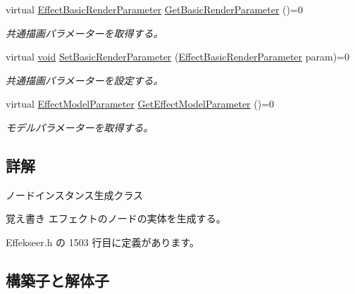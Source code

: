 \begin{DoxyCompactItemize}
virtual \mbox{\hyperlink{struct_effekseer_1_1_effect_basic_render_parameter}{Effect\+Basic\+Render\+Parameter}} \mbox{\hyperlink{class_effekseer_1_1_effect_node_a5066e8209dabdcab46eb5fb64de5180d}{Get\+Basic\+Render\+Parameter}} ()=0
\begin{DoxyCompactList}\small\item\em 共通描画パラメーターを取得する。 \end{DoxyCompactList}\item 
virtual \mbox{\hyperlink{namespace_effekseer_ab34c4088e512200cf4c2716f168deb56}{void}} \mbox{\hyperlink{class_effekseer_1_1_effect_node_a064ec945f4ced3b7935520d625e4c92e}{Set\+Basic\+Render\+Parameter}} (\mbox{\hyperlink{struct_effekseer_1_1_effect_basic_render_parameter}{Effect\+Basic\+Render\+Parameter}} param)=0
\begin{DoxyCompactList}\small\item\em 共通描画パラメーターを設定する。 \end{DoxyCompactList}\item 
virtual \mbox{\hyperlink{struct_effekseer_1_1_effect_model_parameter}{Effect\+Model\+Parameter}} \mbox{\hyperlink{class_effekseer_1_1_effect_node_a6fc47c5de5057a81240d4df22887b2c2}{Get\+Effect\+Model\+Parameter}} ()=0
\begin{DoxyCompactList}\small\item\em モデルパラメーターを取得する。 \end{DoxyCompactList}\end{DoxyCompactItemize}


\subsection{詳解}
ノードインスタンス生成クラス 

\begin{DoxyNote}{覚え書き}
エフェクトのノードの実体を生成する。 
\end{DoxyNote}


 Effekseer.\+h の 1503 行目に定義があります。



\subsection{構築子と解体子}
\mbox{\label{class_effekseer_1_1_effect_node_aba9378c17ee790783c2d2add7ec4c16c}} 
